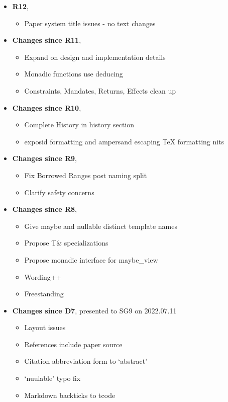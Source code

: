 \documentclass[a4paper,10pt,oneside,openany,final,article]{memoir}
\begin{document}
\begin{itemize}
\item \textbf{R12},
  \begin{itemize}
  \item Paper system title issues - no text changes
  \end{itemize}
\item \textbf{Changes since R11},
  \begin{itemize}
  \item Expand on design and implementation details
  \item Monadic functions use deducing 
  \item Constraints, Mandates, Returns, Effects clean up
  \end{itemize}
\item \textbf{Changes since R10},
  \begin{itemize}
  \item Complete History in history section
  \item exposid formatting and ampersand escaping TeX formatting nits
  \end{itemize}
\item \textbf{Changes since R9},
  \begin{itemize}
  \item Fix Borrowed Ranges post naming split
  \item Clarify safety concerns
  \end{itemize}
\item \textbf{Changes since R8},
  \begin{itemize}
  \item Give maybe and nullable distinct template names
  \item Propose T\& specializations
  \item Propose monadic interface for maybe_view
  \item Wording++
  \item Freestanding
  \end{itemize}
\item \textbf{Changes since D7}, presented to SG9 on 2022.07.11
  \begin{itemize}
  \item Layout issues
  \item References include paper source
  \item Citation abbreviation form to `abstract'
  \item `nuulable' typo fix
  \item Markdown backticks to tcode

\end{itemize}
\end{itemize}
\end{document}
